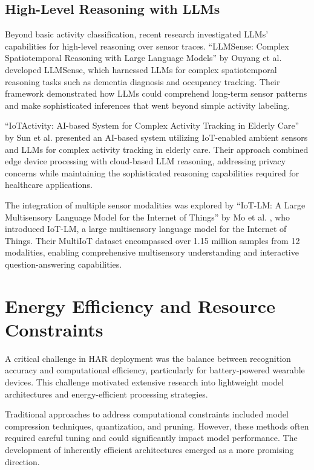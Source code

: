 \subsection{High-Level Reasoning with LLMs}

\hspace{2em}Beyond basic activity classification, recent research investigated LLMs' capabilities for high-level reasoning over sensor traces. ``LLMSense: Complex Spatiotemporal Reasoning with Large Language Models'' by Ouyang et al. \cite{Ouyang2024LLMSense} developed LLMSense, which harnessed LLMs for complex spatiotemporal reasoning tasks such as dementia diagnosis and occupancy tracking. Their framework demonstrated how LLMs could comprehend long-term sensor patterns and make sophisticated inferences that went beyond simple activity labeling.

``IoTActivity: AI-based System for Complex Activity Tracking in Elderly Care'' by Sun et al. \cite{Sun2024IoTActivity} presented an AI-based system utilizing IoT-enabled ambient sensors and LLMs for complex activity tracking in elderly care. Their approach combined edge device processing with cloud-based LLM reasoning, addressing privacy concerns while maintaining the sophisticated reasoning capabilities required for healthcare applications.

The integration of multiple sensor modalities was explored by ``IoT-LM: A Large Multisensory Language Model for the Internet of Things'' by Mo et al. \cite{Mo2024IoTLM}, who introduced IoT-LM, a large multisensory language model for the Internet of Things. Their MultiIoT dataset encompassed over 1.15 million samples from 12 modalities, enabling comprehensive multisensory understanding and interactive question-answering capabilities.

\section{Energy Efficiency and Resource Constraints}

\hspace{2em}A critical challenge in HAR deployment was the balance between recognition accuracy and computational efficiency, particularly for battery-powered wearable devices. This challenge motivated extensive research into lightweight model architectures and energy-efficient processing strategies.

Traditional approaches to address computational constraints included model compression techniques, quantization, and pruning. However, these methods often required careful tuning and could significantly impact model performance. The development of inherently efficient architectures emerged as a more promising direction.

